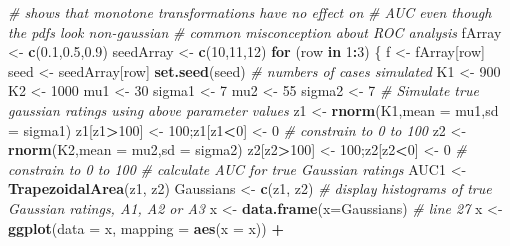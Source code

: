 \documentclass[
]{book}
\newenvironment{Shaded}{\begin{snugshade}}{\end{snugshade}}
\newcommand{\CommentTok}[1]{\textcolor[rgb]{0.56,0.35,0.01}{\textit{#1}}}
\newcommand{\ControlFlowTok}[1]{\textcolor[rgb]{0.13,0.29,0.53}{\textbf{#1}}}
\newcommand{\DataTypeTok}[1]{\textcolor[rgb]{0.13,0.29,0.53}{#1}}
\newcommand{\DecValTok}[1]{\textcolor[rgb]{0.00,0.00,0.81}{#1}}
\newcommand{\FloatTok}[1]{\textcolor[rgb]{0.00,0.00,0.81}{#1}}
\newcommand{\KeywordTok}[1]{\textcolor[rgb]{0.13,0.29,0.53}{\textbf{#1}}}
\newcommand{\NormalTok}[1]{#1}
\newcommand{\OperatorTok}[1]{\textcolor[rgb]{0.81,0.36,0.00}{\textbf{#1}}}
\newcommand{\StringTok}[1]{\textcolor[rgb]{0.31,0.60,0.02}{#1}}
\begin{document}
\begin{Shaded}
\begin{Highlighting}[]
\CommentTok{# shows that monotone transformations have no effect on }
\CommentTok{# AUC even though the pdfs look non-gaussian}
\CommentTok{# common misconception about ROC analysis}
\NormalTok{fArray <-}\StringTok{ }\KeywordTok{c}\NormalTok{(}\FloatTok{0.1}\NormalTok{,}\FloatTok{0.5}\NormalTok{,}\FloatTok{0.9}\NormalTok{)}
\NormalTok{seedArray <-}\StringTok{ }\KeywordTok{c}\NormalTok{(}\DecValTok{10}\NormalTok{,}\DecValTok{11}\NormalTok{,}\DecValTok{12}\NormalTok{)}
\ControlFlowTok{for}\NormalTok{ (row }\ControlFlowTok{in} \DecValTok{1}\OperatorTok{:}\DecValTok{3}\NormalTok{) \{ }
\NormalTok{  f <-}\StringTok{ }\NormalTok{fArray[row]}
\NormalTok{  seed <-}\StringTok{ }\NormalTok{seedArray[row]}
  \KeywordTok{set.seed}\NormalTok{(seed) }
  \CommentTok{# numbers of cases simulated}
\NormalTok{  K1 <-}\StringTok{ }\DecValTok{900}
\NormalTok{  K2 <-}\StringTok{ }\DecValTok{1000}
\NormalTok{  mu1 <-}\StringTok{ }\DecValTok{30}
\NormalTok{  sigma1 <-}\StringTok{ }\DecValTok{7}
\NormalTok{  mu2 <-}\StringTok{ }\DecValTok{55}
\NormalTok{  sigma2 <-}\StringTok{ }\DecValTok{7} 
  \CommentTok{# Simulate true gaussian ratings using above parameter values}
\NormalTok{  z1 <-}\StringTok{ }\KeywordTok{rnorm}\NormalTok{(K1,}\DataTypeTok{mean =}\NormalTok{ mu1,}\DataTypeTok{sd =}\NormalTok{ sigma1)}
\NormalTok{  z1[z1}\OperatorTok{>}\DecValTok{100}\NormalTok{] <-}\StringTok{ }\DecValTok{100}\NormalTok{;z1[z1}\OperatorTok{<}\DecValTok{0}\NormalTok{] <-}\StringTok{ }\DecValTok{0} \CommentTok{# constrain to 0 to 100}
\NormalTok{  z2 <-}\StringTok{ }\KeywordTok{rnorm}\NormalTok{(K2,}\DataTypeTok{mean =}\NormalTok{ mu2,}\DataTypeTok{sd =}\NormalTok{ sigma2)}
\NormalTok{  z2[z2}\OperatorTok{>}\DecValTok{100}\NormalTok{] <-}\StringTok{ }\DecValTok{100}\NormalTok{;z2[z2}\OperatorTok{<}\DecValTok{0}\NormalTok{] <-}\StringTok{ }\DecValTok{0} \CommentTok{# constrain to 0 to 100}
  \CommentTok{# calculate AUC for true Gaussian ratings}
\NormalTok{  AUC1 <-}\StringTok{ }\KeywordTok{TrapezoidalArea}\NormalTok{(z1, z2)}
\NormalTok{  Gaussians <-}\StringTok{ }\KeywordTok{c}\NormalTok{(z1, z2)}
  \CommentTok{# display histograms of true Gaussian ratings, A1, A2 or A3}
\NormalTok{  x <-}\StringTok{ }\KeywordTok{data.frame}\NormalTok{(}\DataTypeTok{x=}\NormalTok{Gaussians) }\CommentTok{#  line 27}
\NormalTok{  x <-}\StringTok{  }
\StringTok{    }\KeywordTok{ggplot}\NormalTok{(}\DataTypeTok{data =}\NormalTok{ x, }\DataTypeTok{mapping =} \KeywordTok{aes}\NormalTok{(}\DataTypeTok{x =}\NormalTok{ x)) }\OperatorTok{+}

\end{Highlighting}
\end{Shaded}
\end{document}
